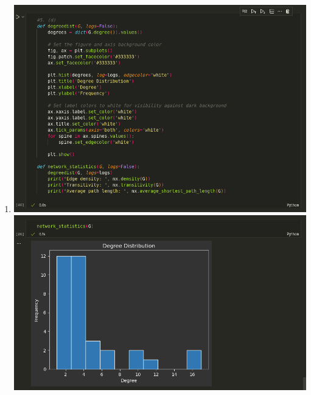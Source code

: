 \documentclass{article}
\begin{document}
\begin{enumerate}[label=(\alph*), left=10pt, itemsep=10pt]
        \item \begin{minipage}[t]{0.9\textwidth}
            \begin{minipage}[t]{0.9\textwidth}
                \vspace{0.1em} %
                \centering
                \includegraphics[width=5.9in]{./5di.png}
                \includegraphics[width=5.9in]{./5dii.png}
            \end{minipage}
        \end{minipage}\\
        \begin{minipage}[t]{0.9\textwidth}
            \begin{minipage}[t]{0.9\textwidth}
                \centering

\end{minipage}
\end{minipage}
\end{enumerate}
\end{document}
